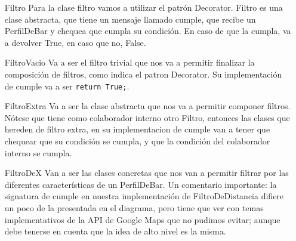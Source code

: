 \begin{itemize}
\item[Filtro] Para la clase filtro vamos a utilizar el patrón Decorator. Filtro es una clase abstracta, que tiene un mensaje llamado cumple, que recibe un PerfilDeBar y chequea que cumpla su condición. En caso de que la cumpla, va a devolver True, en caso que no, False.

\item[FiltroVacio] Va a ser el filtro trivial que nos va a permitir finalizar la composición de filtros, como indica el patron Decorator. Su implementación de cumple va a ser \texttt{return True;}.

\item[FiltroExtra] Va a ser la clase abstracta que nos va a permitir componer filtros. Nótese que tiene como colaborador interno otro Filtro, entonces las clases que hereden de filtro extra, en su implementacion de cumple van a tener que chequear que su condición se cumpla, y que la condición del colaborador interno se cumpla.

\item[FiltroDeX] Van a ser las clases concretas que nos van a permitir filtrar por las diferentes características de un PerfilDeBar. Un comentario importante: la signatura de cumple en nuestra implementación de FiltroDeDistancia difiere un poco de la presentada en el diagrama, pero tiene que ver con temas implementativos de la API de Google Maps que no pudimos evitar; aunque debe tenerse en cuenta que la idea de alto nivel es la misma.
\end{itemize}


